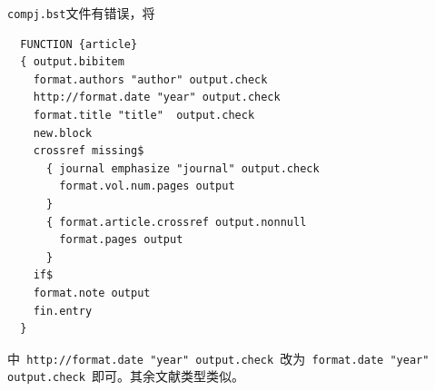 \lstinline|compj.bst|文件有错误，将
\begin{lstlisting}
  FUNCTION {article}
  { output.bibitem
    format.authors "author" output.check
    http://format.date "year" output.check 
    format.title "title"  output.check 
    new.block
    crossref missing$
      { journal emphasize "journal" output.check
        format.vol.num.pages output
      }
      { format.article.crossref output.nonnull
        format.pages output
      }
    if$
    format.note output
    fin.entry
  }
\end{lstlisting}
中\lstinline| http://format.date "year" output.check |改为\lstinline| format.date "year" output.check |即可。其余文献类型类似。